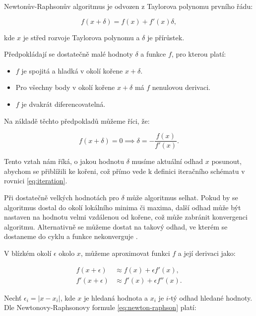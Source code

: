 \documentclass[male,czech,api_bc]{kitheses}
\begin{document}
  Newtonův-Raphsonův algoritmus je odvozen z Taylorova polynomu prvního řádu:

  \begin{equation}
    f(x + \delta) = f(x) + f'(x) \delta,
  \end{equation}

  kde $x$ je střed rozvoje Taylorova polynomu a $\delta$ je přírůstek.

  Předpokládají se dostatečně malé hodnoty $\delta$ a funkce $f$, pro kterou platí:

  \begin{itemize}
    \item $f$ je spojitá a hladká v okolí kořene $x + \delta$.
    \item Pro všechny body v okolí kořene $x + \delta$ má $f$ nenulovou derivaci.
    \item $f$ je dvakrát diferencovatelná.
  \end{itemize}

  Na základě těchto předpokladů můžeme říci, že:

  \begin{equation}
    f(x + \delta) = 0 \implies \delta = - \frac{f(x)}{f'(x)}. \label{eq:newton-raphson}
  \end{equation}

  Tento vztah nám říká, o jakou hodnotu $\delta$ musíme aktuální odhad $x$ posunout, abychom se přiblížili ke kořeni, což přímo vede k definici iteračního schématu v rovnici \eqref{eq:iteration}.

  Při dostatečně velkých hodnotách pro $\delta$ může algoritmus selhat. Pokud by se algoritmus dostal do okolí lokálního minima či maxima, další odhad může být nastaven na hodnotu velmi vzdálenou od kořene, což může zabránit konvergenci algoritmu. Alternativně se můžeme dostat na takový odhad, ve kterém se dostaneme do cyklu a funkce nekonverguje \parencites[kapitola~9.4]{Press2007}.

  V blízkém okolí $\epsilon$ okolo $x$, můžeme aproximovat funkci $f$ a její derivaci jako:

  \begin{align}
    \label{rootedness}
    f(x + \epsilon) &\approx f(x) + \epsilon f'(x), \\
    f'(x + \epsilon) &\approx f'(x) + \epsilon f''(x).
  \end{align}

  Nechť $\epsilon_i = |x - x_i|$, kde $x$ je hledaná hodnota a $x_i$ je $i$-tý odhad hledané hodnoty. Dle Newtonovy-Raphsonovy formule \eqref{eq:newton-raphson} platí:
\end{document}
